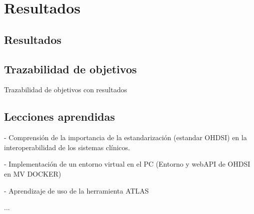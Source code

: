 \chapter{Resultados}\label{cap:10resultados}

\section{Resultados}


\section{Trazabilidad de objetivos}

Trazabilidad de objetivos con resultados

\section{Lecciones aprendidas}

- Comprensión de la importancia de la estandarización (estandar OHDSI) en la interoperabilidad de los sistemas clínicos.

- Implementación de un entorno virtual en el PC (Entorno y webAPI de OHDSI en MV DOCKER)

- Aprendizaje de uso de la herramienta ATLAS

...